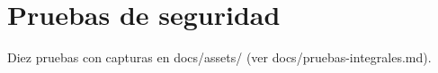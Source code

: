\chapter{Pruebas de seguridad}
Diez pruebas con capturas en docs/assets/ (ver docs/pruebas-integrales.md).
